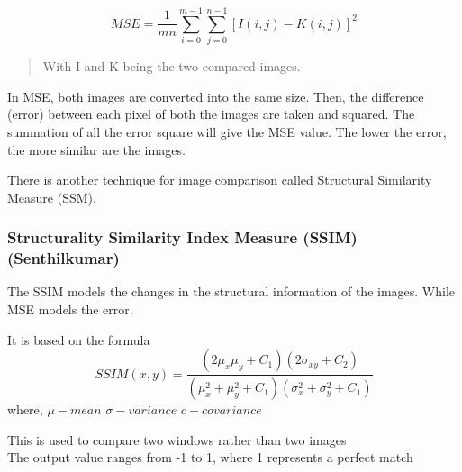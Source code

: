 \documentclass{article}
\begin{document}
 
 \begin{equation}
  MSE = \frac{1}{mn}   \sum^{m-1}_{i=0}  \sum^{n-1}_{j=0} [I(i,j) - K(i,j)] ^2
\end{equation}  
\begin{quote}
With I and K being the two compared images.
\end{quote}


In MSE, both images are converted into the same size. Then, the difference (error) between each pixel of both the images are taken and squared. The summation of all the error square will give the MSE value. 
The lower the error, the more similar are the images. 

There is another technique for image comparison called Structural Similarity Measure (SSM). 

\subsubsection*{Structurality Similarity Index Measure (SSIM)(Senthilkumar)}

The SSIM models the changes in the structural information of the images. While MSE models the error. 

It is based on the formula \cite{third}
\begin{equation}
SSIM(x,y) = \frac{(2\mu_{x}\mu_{y}+C_{1})(2\sigma_{xy}+C_{2})}{(\mu^{2}_{x}+\mu^{2}_{y}+C_{1})(\sigma^{2}_{x}+\sigma^{2}_{y}+C_{1})}
\end{equation}
where, 
$\mu - mean $
$\sigma - variance $
$c - covariance $

This is used to compare two windows rather than two images \\ 
The output value ranges from -1 to 1, where 1 represents a perfect match

\end{document}
